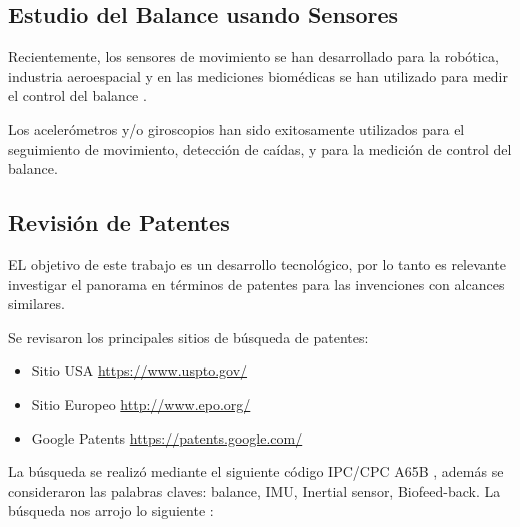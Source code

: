 \documentclass[12pt,a4paper]{article}
\begin{document}
\subsection{Estudio del Balance usando Sensores}
Recientemente, los sensores de movimiento se han desarrollado para la robótica, industria aeroespacial y en las mediciones biomédicas se han utilizado para medir el control del balance \cite{mancini_relevance_2010}.

Los acelerómetros y/o giroscopios han sido exitosamente utilizados \cite{mancini_relevance_2010} para el seguimiento de movimiento,  detección de caídas, y para la medición de control del balance.

\newpage
\subsection{Revisión de Patentes}
EL objetivo de este trabajo es un desarrollo tecnológico, por lo tanto es relevante investigar el panorama en términos de patentes para las invenciones con alcances similares.

Se revisaron los principales sitios de búsqueda de patentes:
\begin{itemize}
	\item Sitio USA \url{https://www.uspto.gov/}
	\item Sitio Europeo \url{http://www.epo.org/}
	\item Google Patents  \url{https://patents.google.com/}
\end{itemize}
La búsqueda se realizó mediante el siguiente código IPC/CPC  A65B \cite{patentes}, además se consideraron las palabras claves: balance, IMU, Inertial sensor, Biofeed-back. 
La búsqueda nos arrojo lo siguiente : 
\end{document}
